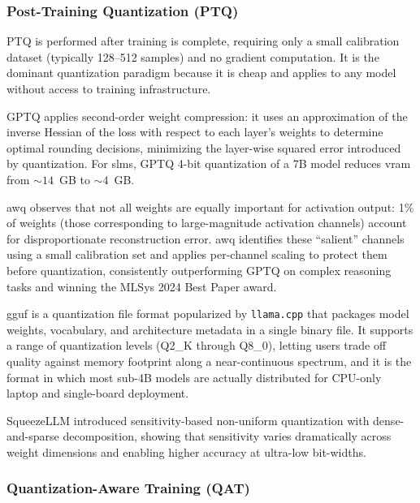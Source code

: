 \subsubsection{Post-Training Quantization (PTQ)}

PTQ is performed after training is complete, requiring only a small calibration dataset (typically 128--512 samples) and no gradient computation. It is the dominant quantization paradigm because it is cheap and applies to any model without access to training infrastructure.

GPTQ \citep{frantar2023gptq} applies second-order weight compression: it uses an approximation of the inverse Hessian of the loss with respect to each layer's weights to determine optimal rounding decisions, minimizing the layer-wise squared error introduced by quantization. For \glspl{slm}, GPTQ 4-bit quantization of a 7B model reduces \gls{vram} from ${\sim}14$~GB to ${\sim}4$~GB.

\gls{awq} \citep{lin2024awq} observes that not all weights are equally important for activation output: 1\% of weights (those corresponding to large-magnitude activation channels) account for disproportionate reconstruction error. \gls{awq} identifies these ``salient'' channels using a small calibration set and applies per-channel scaling to protect them before quantization, consistently outperforming GPTQ on complex reasoning tasks and winning the MLSys 2024 Best Paper award.

\gls{gguf} is a quantization file format popularized by \texttt{llama.cpp} \citep{gerganov2023llamacpp} that packages model weights, vocabulary, and architecture metadata in a single binary file. It supports a range of quantization levels (Q2\_K through Q8\_0), letting users trade off quality against memory footprint along a near-continuous spectrum, and it is the format in which most sub-4B models are actually distributed for CPU-only laptop and single-board deployment.

SqueezeLLM \citep{kim2024squeezellm} introduced sensitivity-based non-uniform quantization with dense-and-sparse decomposition, showing that sensitivity varies dramatically across weight dimensions and enabling higher accuracy at ultra-low bit-widths.

\subsubsection{Quantization-Aware Training (QAT)}

